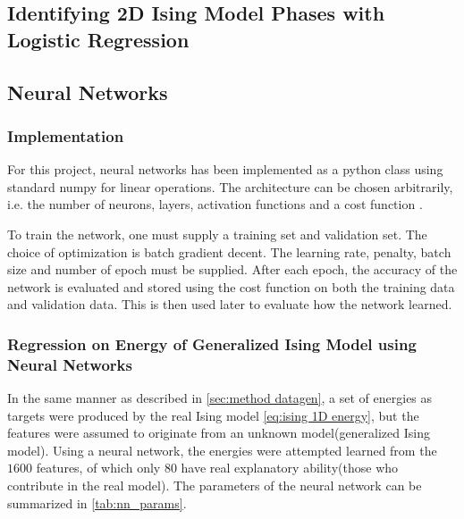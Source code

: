 \subsection{Identifying 2D Ising Model Phases with Logistic Regression}\label{sec:method logreg}

\subsection{Neural Networks}\label{sec:method NN}
\subsubsection{Implementation}
For this project, neural networks has been implemented as a python class using standard numpy for linear operations. The architecture can be chosen arbitrarily, i.e. the number of neurons, layers, activation functions and a cost function .

To train the network, one must supply a training set and validation set. The choice of optimization is batch gradient decent. The learning rate, penalty, batch size and number of epoch must be supplied. After each epoch, the accuracy of the network is evaluated and stored using the cost function on both the training data and validation data. This is then used later to evaluate how the network learned.

\subsubsection{Regression on Energy of Generalized Ising Model using Neural 
Networks}

In the same manner as described in \autoref{sec:method datagen}, a set of energies 
as targets were produced by the real Ising model \autoref{eq:ising 1D energy}, but the features were assumed to originate from an unknown model(generalized Ising model). Using a neural network, the energies were attempted learned from the $1600$ features, of which only $80$ have real explanatory ability(those who contribute in the real model). The parameters of the neural network can be summarized in \autoref{tab:nn_params}.


